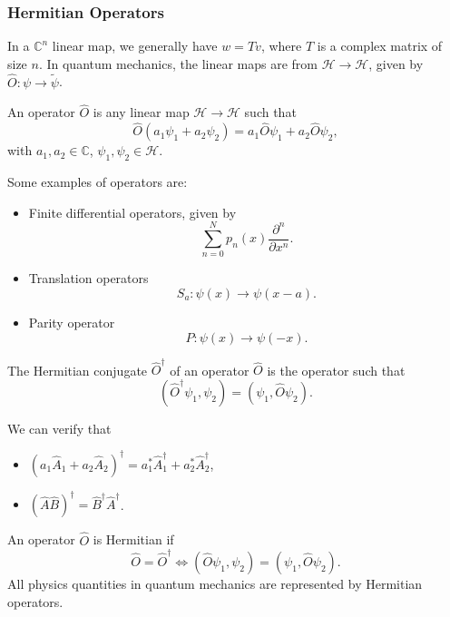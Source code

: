 \documentclass[12pt]{article}
\begin{document}
\subsubsection{Hermitian Operators}%
\label{subsub:hermitian_operators}

In a $\mathbb{C}^{n}$ linear map, we generally have $w = Tv$, where $T$ is a complex matrix of size $n$. In quantum mechanics, the linear maps are from $\mathcal{H} \to \mathcal{H}$, given by $\hat O : \psi \to \tilde \psi$.

\begin{definition}
	An operator $\hat O$ is any linear map $\mathcal{H} \to \mathcal{H}$ such that
	\[
		\hat O(a_1 \psi_1 + a_2 \psi_2) = a_1 \hat O \psi_1 + a_2 \hat O \psi_2
	,\]
	with $a_1, a_2 \in \mathbb{C}$, $\psi_1, \psi_2 \in \mathcal{H}$.
\end{definition}

Some examples of operators are:
\begin{itemize}
	\item Finite differential operators, given by
		\[
			\sum_{n = 0}^{N} p_n(x) \frac{\partial^{n}}{\partial x^{n}}
		.\]
	\item Translation operators
		\[
			S_a : \psi(x) \to \psi(x - a)
		.\]
	\item Parity operator
		\[
			P : \psi(x) \to \psi(-x)
		.\]
\end{itemize}

\begin{definition}
	The Hermitian conjugate $\hat O^{\dagger}$ of an operator $\hat O$ is the operator such that
	\[
		(\hat O^{\dagger} \psi_1, \psi_2) = (\psi_1, \hat O \psi_2)
	.\]
\end{definition}
We can verify that
\begin{itemize}
	\item $(a_1 \hat A_1 + a_2 \hat A_2)^{\dagger} = a_1^{\ast}\hat A_1^{\dagger} + a_2^{\ast} \hat A_2^{\dagger}$,
	\item $(\hat A \hat B)^{\dagger} = \hat B^{\dagger} \hat A^{\dagger}$.
\end{itemize}

\begin{definition}
	An operator $\hat O$ is Hermitian if
	\[
		\hat O = \hat O^{\dagger} \iff (\hat O \psi_1, \psi_2) = (\psi_1, \hat O \psi_2)
	.\]
	All physics quantities in quantum mechanics are represented by Hermitian operators.
\end{definition}
\end{document}
